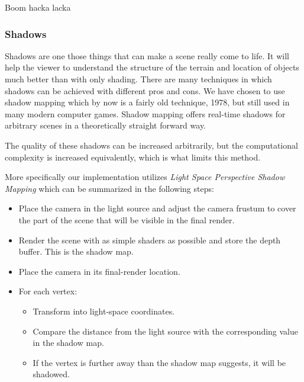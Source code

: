Boom hacka lacka

\subsubsection{Shadows}
Shadows are one those things that can make a scene really come to life. It will help the viewer to understand the structure of the terrain and location of objects much better than with only shading. There are many techniques in which shadows can be achieved with different pros and cons. We have chosen to use shadow mapping \cite{ShadowMapping} which by now is a fairly old technique, 1978, but still used in many modern computer games. Shadow mapping offers real-time shadows for arbitrary scenes in a theoretically straight forward way. 

The quality of these shadows can be increased arbitrarily, but the computational complexity is increased equivalently, which is what limits this method. 

More specifically our implementation utilizes \textit{Light Space Perspective Shadow Mapping} \cite{LSPShadowMapping} which can be summarized in the following steps:

\begin{itemize}
\item Place the camera in the light source and adjust the camera frustum to cover the part of the scene that will be visible in the final render.
\item Render the scene with as simple shaders as possible and store the depth buffer. This is the shadow map.
\item Place the camera in its final-render location.
\item For each vertex:
\begin{itemize}
\item Transform into light-space coordinates.
\item Compare the distance from the light source with the corresponding value in the shadow map.
\item If the vertex is further away than the shadow map suggests, it will be shadowed. 
\end{itemize}
\end{itemize}

